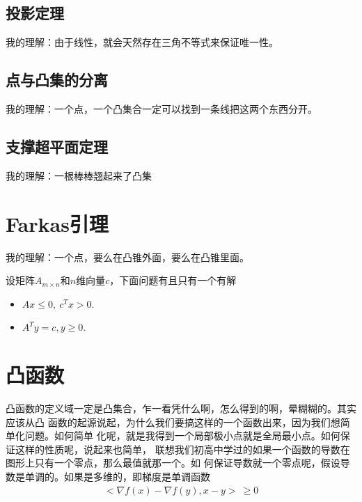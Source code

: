 \documentclass[UTF8]{ctexbook}
\begin{document}
\subsection{投影定理}
我的理解：由于线性，就会天然存在三角不等式来保证唯一性。


\subsection{点与凸集的分离}

我的理解：一个点，一个凸集合一定可以找到一条线把这两个东西分开。



\subsection{支撑超平面定理}

我的理解：一根棒棒翘起来了凸集

\section{Farkas引理}
我的理解：一个点，要么在凸锥外面，要么在凸锥里面。




设矩阵$A_{ m \times n} $和$n$维向量$c$，下面问题有且只有一个有解
\begin{itemize}
\item $A x \leq 0, \ c^T x > 0 $.
\item $A^T y = c, y \ge 0$.
\end{itemize}

\section{凸函数}
凸函数的定义域一定是凸集合，乍一看凭什么啊，怎么得到的啊，晕糊糊的。其实应该从凸
函数的起源说起，为什么我们要搞这样的一个函数出来，因为我们想简单化问题。如何简单
化呢，就是我得到一个局部极小点就是全局最小点。如何保证这样的性质呢，说起来也简单，
联想我们初高中学过的如果一个函数的导数在图形上只有一个零点，那么最值就那一个。如
何保证导数就一个零点呢，假设导数是单调的。如果是多维的，即梯度是单调函数
\begin{align}
  < \nabla f(x) - \nabla f(y), x - y > \ \ge 0
\end{align}
\end{document}
